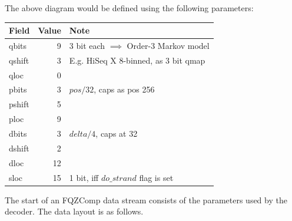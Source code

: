 \documentclass[a4paper]{article}
\begin{document}
The above diagram would be defined using the following parameters:

%
%
%

\begin{tabular}{lrl}
\hline
\textbf{Field} & \textbf{Value} & \textbf{Note}\\
\hline
qbits  & 9  & 3 bit each $\implies$ Order-3 Markov model \\
qshift & 3  & E.g. HiSeq X 8-binned, as 3 bit qmap \\
qloc   & 0  \\
\hline
pbits  & 3  & $pos / 32$, caps as pos 256\\
pshift & 5  \\
ploc   & 9  \\
\hline
dbits  & 3  & $delta / 4$, caps at 32\\
dshift & 2  \\
dloc   & 12 \\
\hline
sloc   & 15 & 1 bit, iff $do\_strand$ flag is set\\
\hline
\end{tabular}


The start of an FQZComp data stream consists of the parameters used by
the decoder. The data layout is as follows.
\end{document}
